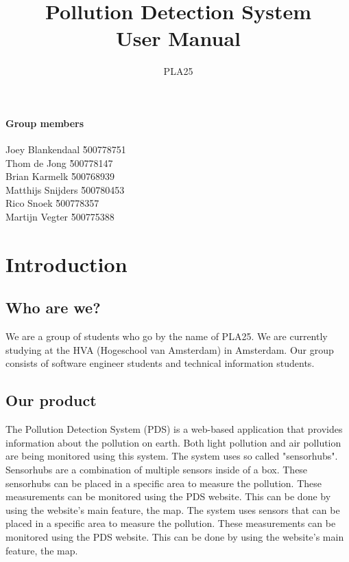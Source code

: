 \documentclass[a4paper]{article}
\title{Pollution Detection System\\User Manual}
\author{PLA25}
\begin{document}
\maketitle
\vspace*{\fill}

\paragraph{Group members}
\begin{tabbing}
	Joey Blankendaal 	\` 	500778751 	\\
	Thom de Jong 		\` 	500778147 	\\
	Brian Karmelk 		\` 	500768939 	\\
	Matthijs Snijders 	\` 	500780453 	\\
	Rico Snoek 			\` 	500778357 	\\
	Martijn Vegter 		\` 	500775388
\end{tabbing}

\thispagestyle{empty}
\pagebreak

\tableofcontents
\pagebreak

\section{Introduction}

\subsection{Who are we?}
We are a group of students who go by the name of PLA25. We are currently studying at the HVA (Hogeschool van Amsterdam) in Amsterdam. Our group consists of software engineer students and technical information students.

\subsection{Our product}
The Pollution Detection System (PDS) is a web-based application that provides information about the pollution on earth. Both light pollution and air pollution are being monitored using this system.
\newline
The system uses so called "sensorhubs". Sensorhubs are a combination of multiple sensors inside of a box. These sensorhubs can be placed in a specific area to measure the pollution. These measurements can be monitored using the PDS website. This can be done by using the website's main feature, the map.
The system uses sensors that can be placed in a specific area to measure the pollution. These measurements can be monitored using the PDS website. This can be done by using the website's main feature, the map.
\end{document}
